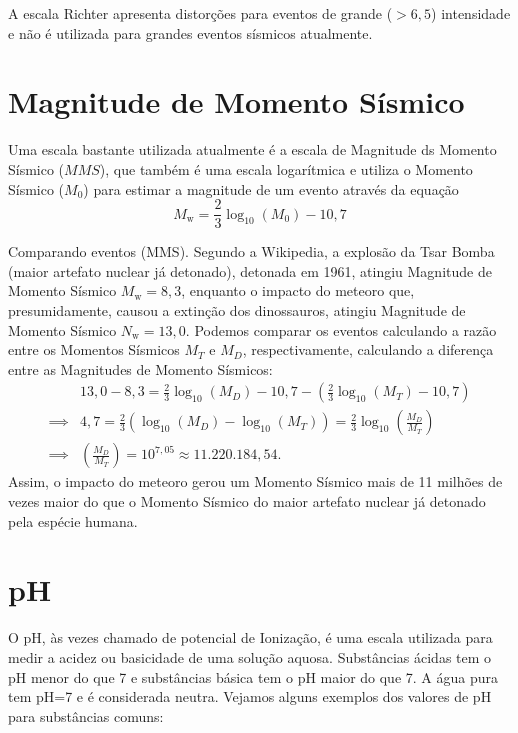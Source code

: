 A escala Richter apresenta distorções para eventos de grande ($>6{,}5$) intensidade e não é utilizada para grandes eventos sísmicos atualmente.

\section{Magnitude de Momento Sísmico}

Uma escala bastante utilizada atualmente é a escala de Magnitude ds Momento Sísmico ($MMS$), que também é uma escala logarítmica e utiliza o Momento Sísmico ($M_0$) para estimar a magnitude de um evento através da equação
$$
M_{\mathrm {w} }={\frac{2}{3}}\log_{10}\left(M_{0}\right)-10,7
$$

\begin{example}{Comparando eventos (MMS).}
Segundo a Wikipedia, a explosão da Tsar Bomba (maior artefato nuclear já detonado), detonada em 1961, atingiu Magnitude de Momento Sísmico $M_{\mathrm w} = 8{,}3$, enquanto o impacto do meteoro que, presumidamente, causou a extinção dos dinossauros, atingiu Magnitude de Momento Sísmico $N_{\mathrm w} = 13{,}0$. Podemos comparar os eventos calculando a razão entre os Momentos Sísmicos $M_T$ e $M_D$, respectivamente, calculando a diferença entre as Magnitudes de Momento Sísmicos:
\begin{align*}
&13{,}0-8{,}3 = {\frac{2}{3}}\log_{10}\left(M_{D}\right)-10,7-\left( {\frac{2}{3}}\log_{10}\left(M_{T}\right)-10,7\right)\\
\implies & 4{,}7 = {\frac{2}{3}}\left(\log_{10}\left(M_{D}\right)-\log_{10}\left(M_{T}\right)\right) =  {\frac{2}{3}}\log_{10}\left(\frac{M_D}{M_T}\right)\\
\implies & \left(\frac{M_D}{M_T}\right) = 10^{7{,}05} \approx 11.220.184{,}54.
\end{align*} 
Assim, o impacto do meteoro gerou um Momento Sísmico mais de 11 milhões de vezes maior do que o Momento Sísmico do maior artefato nuclear já detonado pela espécie humana. 
\end{example}

\section{pH}

O pH, às vezes chamado de potencial de Ionização, é uma escala utilizada para medir a acidez ou basicidade de uma solução aquosa. Substâncias ácidas tem o pH menor do que 7 e substâncias básica tem o pH maior do que 7. A água pura tem pH=7 e é considerada neutra. Vejamos alguns exemplos dos valores de pH  para substâncias comuns:


